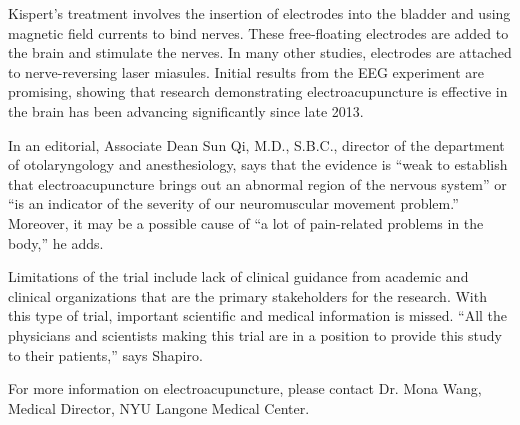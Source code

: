 \documentclass{article}
\begin{document}
Kispert’s treatment involves the insertion of electrodes into the bladder and using magnetic field currents to bind nerves. These free-floating electrodes are added to the brain and stimulate the nerves. In many other studies, electrodes are attached to nerve-reversing laser miasules. Initial results from the EEG experiment are promising, showing that research demonstrating electroacupuncture is effective in the brain has been advancing significantly since late 2013.

In an editorial, Associate Dean Sun Qi, M.D., S.B.C., director of the department of otolaryngology and anesthesiology, says that the evidence is “weak to establish that electroacupuncture brings out an abnormal region of the nervous system” or “is an indicator of the severity of our neuromuscular movement problem.” Moreover, it may be a possible cause of “a lot of pain-related problems in the body,” he adds.

Limitations of the trial include lack of clinical guidance from academic and clinical organizations that are the primary stakeholders for the research. With this type of trial, important scientific and medical information is missed. “All the physicians and scientists making this trial are in a position to provide this study to their patients,” says Shapiro.

For more information on electroacupuncture, please contact Dr. Mona Wang, Medical Director, NYU Langone Medical Center.
\end{document}
